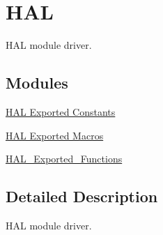 \hypertarget{group___h_a_l}{\section{H\-A\-L}
\label{group___h_a_l}
}


H\-A\-L module driver.  


\subsection*{Modules}
\begin{DoxyCompactItemize}
\item 
\hyperlink{group___h_a_l___exported___constants}{H\-A\-L Exported Constants}
\item 
\hyperlink{group___h_a_l___exported___macros}{H\-A\-L Exported Macros}
\item 
\hyperlink{group___h_a_l___exported___functions}{H\-A\-L\-\_\-\-Exported\-\_\-\-Functions}
\end{DoxyCompactItemize}


\subsection{Detailed Description}
H\-A\-L module driver. 